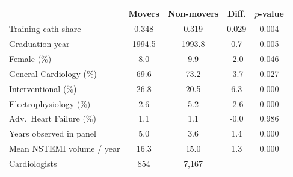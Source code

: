 \begin{tabular}{lcccc}
\toprule
 & Movers & Non-movers & Diff. & $p$-value \\
\midrule
Training cath share & 0.348 & 0.319 & 0.029 & 0.004 \\
Graduation year & 1994.5 & 1993.8 & 0.7 & 0.005 \\
Female (\%) & 8.0 & 9.9 & -2.0 & 0.046 \\
General Cardiology (\%) & 69.6 & 73.2 & -3.7 & 0.027 \\
Interventional (\%) & 26.8 & 20.5 & 6.3 & 0.000 \\
Electrophysiology (\%) & 2.6 & 5.2 & -2.6 & 0.000 \\
Adv.\ Heart Failure (\%) & 1.1 & 1.1 & -0.0 & 0.986 \\
Years observed in panel & 5.0 & 3.6 & 1.4 & 0.000 \\
Mean NSTEMI volume / year & 16.3 & 15.0 & 1.3 & 0.000 \\
\midrule
Cardiologists & 854 & 7,167 &  &  \\
\bottomrule
\end{tabular}


